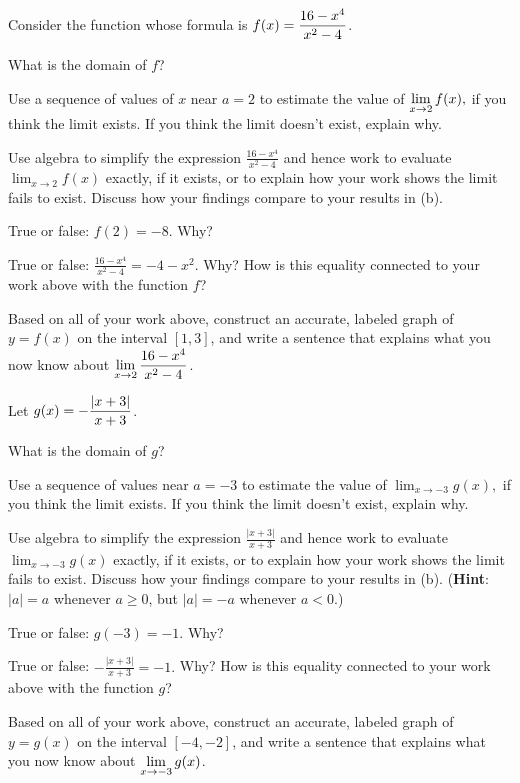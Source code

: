 \begin{exercises} 
\item Consider the function whose formula is $\displaystyle f(x) = \frac{16-x^4}{x^2-4}$.
  \ba
  	\item What is the domain of $f$?
	\item Use a sequence of values of $x$ near $a = 2$ to estimate the value of $\displaystyle \lim_{x \to 2} f(x),$
	if you think the limit exists.  If you think the limit doesn't exist, explain why.
	\item Use algebra to simplify the expression $\frac{16-x^4}{x^2-4}$ and hence work to evaluate $\lim_{x \to 2} f(x)$ exactly, if it exists, or to explain how your work shows the limit fails to exist.  Discuss how your findings compare to your results in (b).
	\item True or false: $f(2) = -8$.  Why?
	\item True or false: $\frac{16-x^4}{x^2-4} = -4-x^2.$  Why?  How is this equality connected to your work above with the function $f$?
	\item Based on all of your work above, construct an accurate, labeled graph of $y = f(x)$ on the interval $[1,3]$, and write a sentence that explains what you now know about $\displaystyle \lim_{x \to 2} \frac{16-x^4}{x^2-4}$.
  \ea
 
\begin{exerciseSolution}
\end{exerciseSolution}
\item  Let $\displaystyle g(x) = -\frac{|x+3|}{x+3}$.
  \ba
  	\item What is the domain of $g$?
	\item Use a sequence of values near $a = -3$ to estimate the value of
	$\lim_{x \to -3} g(x),$
	if you think the limit exists.  If you think the limit doesn't exist, explain why. 
	\item Use algebra to simplify the expression $\frac{|x+3|}{x+3}$ and hence work to evaluate $\lim_{x \to -3} g(x)$ exactly, if it exists, or to explain how your work shows the limit fails to exist.  Discuss how your findings compare to your results in (b).  ({\bf Hint}: $|a| = a$ whenever $a \ge 0$, but $|a| = -a$ whenever $a < 0$.)
	\item True or false: $g(-3) = -1$.  Why?
	\item True or false: $-\frac{|x+3|}{x+3} = -1.$  Why?  How is this equality connected to your work above with the function $g$?
	\item Based on all of your work above, construct an accurate, labeled graph of $y = g(x)$ on the interval $[-4,-2]$, and write a sentence that explains what you now know about $\displaystyle \lim_{x \to -3} g(x)$.
  \ea



\end{exercises}
